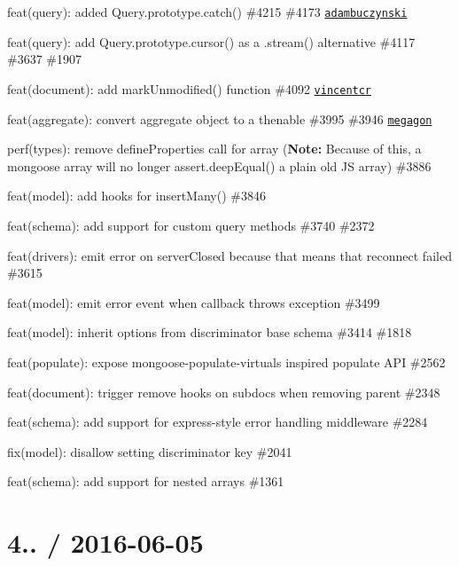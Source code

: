 \begin{DoxyItemize}
\item feat(query)\+: added Query.\+prototype.\+catch() \#4215 \#4173 \href{https://github.com/adambuczynski}{\tt adambuczynski}
\item feat(query)\+: add Query.\+prototype.\+cursor() as a .stream() alternative \#4117 \#3637 \#1907
\item feat(document)\+: add mark\+Unmodified() function \#4092 \href{https://github.com/vincentcr}{\tt vincentcr}
\item feat(aggregate)\+: convert aggregate object to a thenable \#3995 \#3946 \href{https://github.com/megagon}{\tt megagon}
\item perf(types)\+: remove define\+Properties call for array ({\bfseries Note\+:} Because of this, a mongoose array will no longer {\ttfamily assert.\+deep\+Equal()} a plain old JS array) \#3886
\item feat(model)\+: add hooks for insert\+Many() \#3846
\item feat(schema)\+: add support for custom query methods \#3740 \#2372
\item feat(drivers)\+: emit error on \textquotesingle{}server\+Closed\textquotesingle{} because that means that reconnect failed \#3615
\item feat(model)\+: emit error event when callback throws exception \#3499
\item feat(model)\+: inherit options from discriminator base schema \#3414 \#1818
\item feat(populate)\+: expose mongoose-\/populate-\/virtuals inspired populate A\+PI \#2562
\item feat(document)\+: trigger remove hooks on subdocs when removing parent \#2348
\item feat(schema)\+: add support for express-\/style error handling middleware \#2284
\item fix(model)\+: disallow setting discriminator key \#2041
\item feat(schema)\+: add support for nested arrays \#1361
\end{DoxyItemize}

\section*{4.. / 2016-\/06-\/05 }


